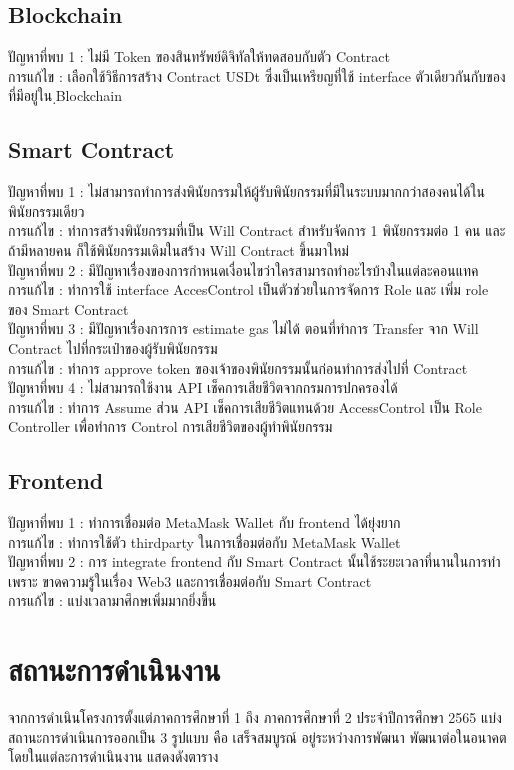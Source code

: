 \documentclass[12pt,oneside,openright,a4paper]{cpe-thai-project}
\begin{document}
\subsection{Blockchain}
\tab ปัญหาที่พบ 1 : ไม่มี Token ของสินทรัพย์ดิจิทัลให้ทดสอบกับตัว Contract \\
\tab การแก้ไข : เลือกใช้วิธีการสร้าง Contract USDt ซึ่งเป็นเหรียญที่ใช้ interface ตัวเดียวกันกับของที่มีอยู่ใน ฺBlockchain
\subsection{Smart Contract}
\tab ปัญหาที่พบ 1 : ไม่สามารถทำการส่งพินัยกรรมให้ผู้รับพินัยกรรมที่มีในระบบมากกว่าสองคนได้ใน พินัยกรรมเดียว\\
\tab การแก้ไข : ทำการสร้างพินัยกรรมที่เป็น Will Contract สำหรับจัดการ 1 พินัยกรรมต่อ 1 คน และถ้ามีหลายคน ก็ใช้พินัยกรรมเดิมในสร้าง Will Contract ขึ้นมาใหม่\\
\tab ปัญหาที่พบ 2 : มีปัญหาเรื่องของการกำหนดเงื่อนไขว่าใครสามารถทำอะไรบ้างในแต่ละคอนแทค\\
\tab การแก้ไข : ทำการใช้ interface AccesControl เป็นตัวช่วยในการจัดการ Role และ เพิ่ม role ของ Smart Contract\\
\tab ปัญหาที่พบ 3 : มีปัญหาเรื่องการการ estimate gas ไม่ได้ ตอนที่ทำการ Transfer จาก Will Contract ไปที่กระเป๋าของผู้รับพินัยกรรม\\
\tab การแก้ไข : ทำการ approve token ของเจ้าของพินัยกรรมนั้นก่อนทำการส่งไปที่ Contract\\
\tab ปัญหาที่พบ 4 : ไม่สามารถใช้งาน API เช็คการเสียชีวิตจากกรมการปกครองได้\\
\tab การแก้ไข : ทำการ Assume ส่วน API เช็คการเสียชีวิตแทนด้วย AccessControl เป็น Role Controller เพื่อทำการ Control การเสียชีวิตของผู้ทำพินัยกรรม
\subsection{Frontend}
\tab ปัญหาที่พบ 1 : ทำการเชื่อมต่อ MetaMask Wallet กับ frontend ได้ยุ่งยาก\\
\tab การแก้ไข : ทำการใช้ตัว thirdparty ในการเชื่อมต่อกับ MetaMask Wallet\\
\tab ปัญหาที่พบ 2 : การ integrate frontend กับ Smart Contract นั้นใช้ระยะเวลาที่นานในการทำ เพราะ ขาดความรู้ในเรื่อง Web3 และการเชื่อมต่อกับ Smart Contract\\
\tab การแก้ไข : แบ่งเวลามาศึกษเพิ่มมากยิ่งขึ้น\\
\section{สถานะการดำเนินงาน}
\tab จากการดำเนินโครงการตั้งแต่ภาคการศึกษาที่ 1 ถึง ภาคการศึกษาที่ 2 ประจำปีการศึกษา 2565 แบ่งสถานะการดำเนินการออกเป็น 3 รูปแบบ คือ เสร็จสมบูรณ์ อยู่ระหว่างการพัฒนา พัฒนาต่อในอนาคต โดยในแต่ละการดำเนินงาน แสดงดังตาราง
\end{document}
